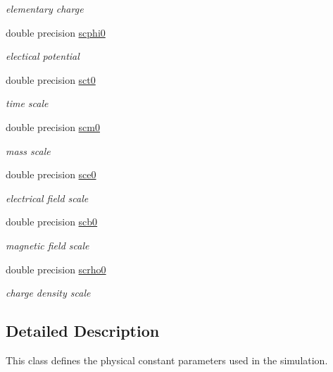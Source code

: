 \begin{DoxyCompactItemize}
\begin{DoxyCompactList}\small\item\em elementary charge \end{DoxyCompactList}\item 
double precision \mbox{\hyperlink{namespacephysconstclass_a6af6ed4a46c6f27b3041a94ca6df16b0}{scphi0}}
\begin{DoxyCompactList}\small\item\em electical potential \end{DoxyCompactList}\item 
double precision \mbox{\hyperlink{namespacephysconstclass_a3f034deff4a556e270ebc5eb27a3bca3}{sct0}}
\begin{DoxyCompactList}\small\item\em time scale \end{DoxyCompactList}\item 
double precision \mbox{\hyperlink{namespacephysconstclass_a6b0e64e20a4a76b514d7009c40e0596a}{scm0}}
\begin{DoxyCompactList}\small\item\em mass scale \end{DoxyCompactList}\item 
double precision \mbox{\hyperlink{namespacephysconstclass_a0138d4fbdcbcfcfae9235e40adef3dc2}{sce0}}
\begin{DoxyCompactList}\small\item\em electrical field scale \end{DoxyCompactList}\item 
double precision \mbox{\hyperlink{namespacephysconstclass_aa4295e4df81160129b34fec287bdc244}{scb0}}
\begin{DoxyCompactList}\small\item\em magnetic field scale \end{DoxyCompactList}\item 
double precision \mbox{\hyperlink{namespacephysconstclass_a9afe1d266547fa8e36280a8788e2a909}{scrho0}}
\begin{DoxyCompactList}\small\item\em charge density scale \end{DoxyCompactList}\end{DoxyCompactItemize}


\subsection{Detailed Description}
This class defines the physical constant parameters used in the simulation. 

